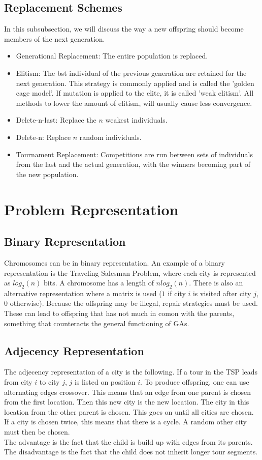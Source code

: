 \documentclass[12pt]{book}
\begin{document}
\subsection{Replacement Schemes}
In this subsubsection, we will discuss the way a new offspring should become members of the next generation.
\begin{itemize}
\item Generational Replacement: The entire population is replaced.
\item Elitism: The bst individual of the previous generation are retained for the next generation. This strategy is commonly applied and is called the 'golden cage model'. If mutation is applied to the elite, it is called 'weak elitism'. All methods to lower the amount of elitism, will usually cause less convergence.
\item Delete-n-last: Replace the $n$ weakest individuals.
\item Delete-n: Replace $n$ random individuals.
\item Tournament Replacement: Competitions are run between sets of individuals from the last and the actual generation, with the winners becoming part of the new population.
\end{itemize}
\section{Problem Representation}
\subsection{Binary Representation}
Chromosomes can be in binary representation. An example of a binary representation is the Traveling Salesman Problem, where each city is represented as $log_2(n)$ bits. A chromosome has a length of $nlog_2(n)$. There is also an alternative representation where a matrix is used ($1$ if city $i$ is visited after city $j$, $0$ otherwise). Because the offspring may be illegal, repair strategies must be used. These can lead to offspring that has not much in comon with the parents, something that counteracts the general functioning of GAs.
\subsection{Adjecency Representation}
The adjecency representation of a city is the following. If a tour in the TSP leads from city $i$ to city $j$, $j$ is listed on position $i$. To produce offspring, one can use alternating edges crossover. This means that an edge from one parent is chosen from the first location. Then this new city is the new location. The city in this location from the other parent is chosen. This goes on until all cities are chosen. If a city is chosen twice, this means that there is a cycle. A random other city must then be chosen.\\
The advantage is the fact that the child is build up with edges from its parents. The disadvantage is the fact that the child does not inherit longer tour segments.
\end{document}
